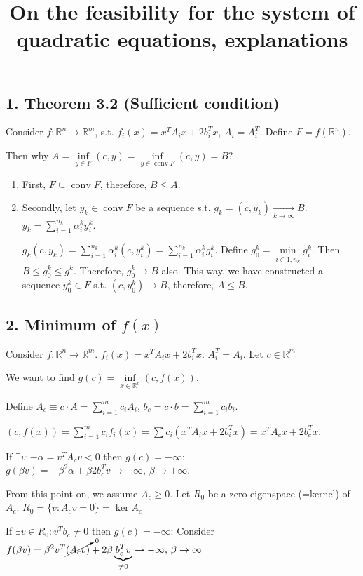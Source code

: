 \documentclass[a4paper]{article}
\date{}
\title{On the feasibility for the system of quadratic equations, explanations}
\DeclareMathOperator{\conv}{conv}
\begin{document}
\maketitle
\subsection*{1. Theorem 3.2 (Sufficient condition)}
Consider $f\colon \mathbb{R}^n\to\mathbb{R}^m$, s.t. $f_i(x)=x^TA_ix+2b_i^Tx$, $A_i=A_i^T$. Define $F=f(\mathbb{R}^n)$.

Then why $A=\inf \limits_{y\in F} (c,y)=\inf\limits_{y\in\conv F} (c,y)=B$?

\begin{enumerate}
\item First, $F\subseteq \conv F$, therefore, $B\leqslant A$.
\item Secondly, let $y_k\in \conv F$ be a sequence s.t. $g_k=(c,y_k)\underset{k\to\infty}{\longrightarrow} B$. $y_k=\sum\limits_{i=1}^{n_k}\alpha^k_iy^k_i$.

$g_k(c,y_k)=\sum\limits_{i=1}^{n_k}\alpha^k_i(c,y^k_i)=\sum\limits_{i=1}^{n_k}\alpha^k_i g^k_i$. Define $g^k_0=\min\limits_{i\in \overline{1,n_k}}g^k_i$. Then $B\leqslant g^k_0\leqslant g^k$. Therefore, $g^k_0\to B$ also. This way, we have constructed a sequence $y^k_0\in F$ s.t. $(c,y^k_0)\to B$, therefore, $A\leqslant B$.
\end{enumerate}

\subsection*{2. Minimum of $f(x)$}
Consider $f\colon \mathbb{R}^n\to\mathbb{R}^m$. $f_i(x)=x^TA_ix+2b_i^Tx$. $A_i^T=A_i$. Let $c\in\mathbb{R}^m$

We want to find
$g(c)=\inf\limits_{x\in\mathbb{R}^n} (c,f(x))$.

Define $A_c\equiv c\cdot A=\sum\limits_{i=1}^m c_iA_i$, $b_c=c\cdot b=\sum\limits_{i=1}^m c_ib_i$.

$(c,f(x))=\sum\limits_{i=1}^m c_i f_i(x)=\sum c_i (x^TA_ix+2b_i^Tx)=x^TA_cx+2b_c^Tx$.

If $\exists v\colon -\alpha=v^TA_cv<0$ then $g(c)=-\infty$:
$g(\beta v)=-\beta^2\alpha+\beta 2b_c^Tv\to-\infty,\,\beta\to+\infty$.

From this point on, we assume $A_c\geqslant 0$. Let $R_0$ be a zero eigenspace (=kernel) of $A_c$: $R_0=\{v\colon A_cv=0\}=\ker A_c$

If $\exists v\in R_0\colon v^Tb_c\neq 0$ then $g(c)=-\infty$: Consider $f(\beta v)=\beta^2 v^T\cancelto{0}{(A_cv)}+2\beta \underbrace{b_c^Tv}_{\neq 0}\to-\infty,\, \beta\to\infty$
\end{document}
